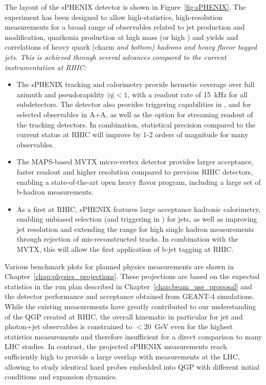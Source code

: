 The layout of the sPHENIX detector is shown in Figure~\ref{fig:sPHENIX}. The experiment has been designed to allow high-statistics, high-resolution measurements for a broad
range of observables related to jet production and modification, quarkonia production
at high mass (or high \pt) and yields and correlations of heavy quark (charm \em and \em bottom) hadrons and heavy flavor tagged jets.
This is achieved through several advances compared to the current instrumentation at RHIC:
\begin{itemize}
    \item The sPHENIX tracking and calorimetry provide hermetic coverage over full azimuth and pseudorapidity $|\eta| < 1$, with a readout rate of 15~kHz for all subdetectors. The detector also provides triggering capabilities in \pp, and for selected observables in A+A, as well as the option for streaming readout of the tracking detectors. In combination, statistical precision compared to the current status at RHIC will improve  by 1-2 orders of magnitude for many observables.
    \item The MAPS-based MVTX micro-vertex detector provides larger acceptance, faster readout and higher resolution compared to previous RHIC detectors, enabling a state-of-the-art open heavy flavor program, including a large set of b-hadron measurements. 
    \item As a first at RHIC, sPHENIX features large acceptance hadronic calorimetry, enabling unbiased selection (and triggering in \pp) for jets, as well as improving jet resolution and extending the range for high \pt single hadron measurements through rejection of mis-reconstructed tracks. In combination with the MVTX, this will allow the first application of b-jet tagging at RHIC. 
\end{itemize}
Various benchmark plots for planned physics
measurements are shown in Chapter~\ref{chap:physics_projections}. These projections are based on the expected statistics in the run plan described in Chapter~\ref{chap:beam_use_proposal} and the detector performance and acceptance obtained from {\textsc{GEANT-4}} simulations. While the existing measurements have greatly contributed to our understanding of the QGP created at RHIC, the overall kinematic in particular for jet and photon+jet observables is constrained to $< 20$~GeV even for the highest statistics measurements and therefore insufficient for a direct comparison to many LHC studies. In contrast, the projected sPHENIX measurements reach sufficiently high \pt to provide a large overlap with  measurements at the LHC, allowing to study identical hard probes embedded into QGP with different initial conditions and expansion dynamics.

